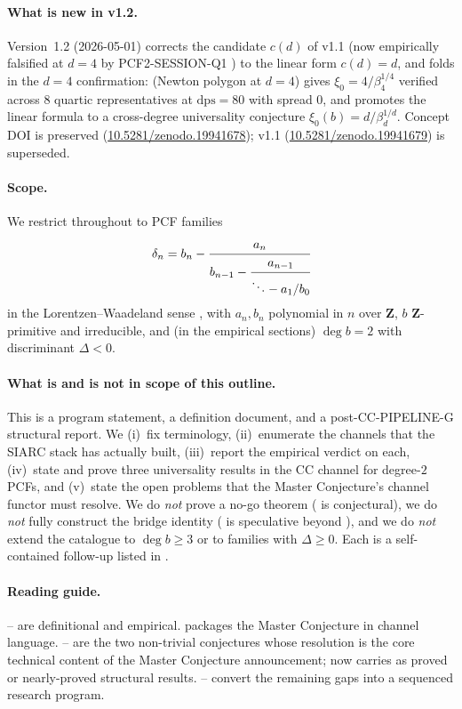 \documentclass[11pt,reqno]{amsart}
\theoremstyle{plain}
\theoremstyle{definition}
\theoremstyle{remark}
\newcommand{\CC}{\mathrm{CC}}
\newcommand{\dn}{\delta_{n}}
\begin{document}
\paragraph{What is new in v1.2.}
Version~1.2 (2026-05-01) corrects the candidate $c(d)$ of
v1.1 (now empirically falsified at $d=4$ by
PCF2-SESSION-Q1 \cite{siarc_pcf2_session_q1}) to the linear
form $c(d) = d$, and folds in the $d=4$ confirmation:
 (Newton polygon at $d=4$) gives
$\xi_0 = 4/\beta_4^{1/4}$ verified across $8$ quartic
representatives at $\mathrm{dps}=80$ with spread $0$, and
 promotes the linear formula to a
cross-degree universality conjecture
$\xi_0(b) = d/\beta_d^{1/d}$. Concept DOI is preserved
(\href{https://doi.org/10.5281/zenodo.19941678}{10.5281/zenodo.19941678});
v1.1 (\href{https://doi.org/10.5281/zenodo.19941679}{10.5281/zenodo.19941679})
is superseded.

\paragraph{Scope.}
We restrict throughout to PCF families
\[
  \dn = b_n - \cfrac{a_n}{b_{n-1} - \cfrac{a_{n-1}}{\ddots - a_1/b_0}}
\]
in the Lorentzen--Waadeland sense \cite{lorentzen2008continued},
with $a_n, b_n$ polynomial in $n$ over $\mathbf{Z}$, $b$
$\mathbf{Z}$-primitive and irreducible, and (in the empirical
sections) $\deg b = 2$ with discriminant $\Delta < 0$.

\paragraph{What is and is not in scope of this outline.}
This is a program statement, a definition document, and a
post-CC-PIPELINE-G structural report. We
(i)~fix terminology, (ii)~enumerate the channels that the
SIARC stack has actually built, (iii)~report the empirical
verdict on each, (iv)~state and prove three universality
results in the $\CC$ channel for degree-$2$ PCFs, and
(v)~state the open problems that the Master Conjecture's
channel functor must resolve. We do \emph{not} prove a no-go
theorem ( is conjectural), we do \emph{not}
fully construct the bridge identity
( is speculative beyond
), and we do \emph{not} extend the catalogue to
$\deg b \ge 3$ or to families with $\Delta \geq 0$. Each is a
self-contained follow-up listed in .

\paragraph{Reading guide.}
-- are definitional and
empirical.  packages the Master
Conjecture in channel language. --%
 are the two non-trivial conjectures whose
resolution is the core technical content of the Master
Conjecture announcement;  now carries
 as proved or
nearly-proved structural results.
-- convert the
remaining gaps into a sequenced research program.
\end{document}

